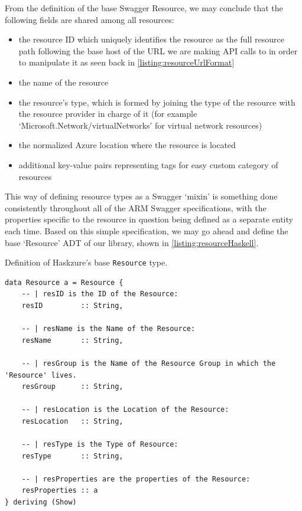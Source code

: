 \documentclass[11pt]{report}
\begin{document}
\newpage

From the definition of the base Swagger Resource, we may conclude that the
following fields are shared among all resources:

\begin{itemize}
    \item{} the resource ID which uniquely identifies the resource as
        the full resource path following the base host of the URL
        we are making API calls to in order to manipulate it as seen back in
        \autoref{listing:resourceUrlFormat}
    \item{} the name of the resource
    \item{} the resource's type, which is formed by joining the type of the
        resource with the resource provider in charge of it (for example
        `Microsoft.Network/virtualNetworks' for virtual network resources)
    \item{} the normalized Azure location where the resource is located
    \item{} additional key-value pairs representing tags for easy custom
        category of resources
\end{itemize}

This way of defining resource types as a Swagger `mixin' is something done
consistently throughout all of the ARM Swagger specifications, with the
properties specific to the resource in question being defined as a separate
entity each time. Based on this simple specification, we may go ahead and
define the base `Resource' ADT of our library, shown in
\autoref{listing:resourceHaskell}.

\begin{listing}[H]
\caption{Definition of Haskzure's base \texttt{Resource} type.}
\label{listing:resourceHaskell}
\begin{verbatim}
data Resource a = Resource {
    -- | resID is the ID of the Resource:
    resID         :: String,

    -- | resName is the Name of the Resource:
    resName       :: String,

    -- | resGroup is the Name of the Resource Group in which the 'Resource' lives.
    resGroup      :: String,

    -- | resLocation is the Location of the Resource:
    resLocation   :: String,

    -- | resType is the Type of Resource:
    resType       :: String,

    -- | resProperties are the properties of the Resource:
    resProperties :: a
} deriving (Show)
\end{verbatim}
\end{listing}
\end{document}

